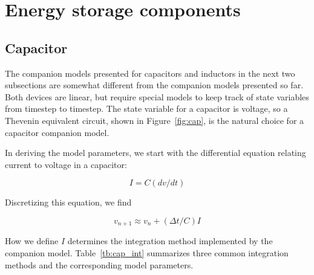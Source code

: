 \documentclass{article}
\begin{document}
\pagebreak

\section{Energy storage components}
\subsection{Capacitor}

The companion models presented for capacitors and inductors in the next two subsections are somewhat different from the companion models presented so far.  Both devices are linear, but require special models to keep track of state variables from timestep to timestep.  The state variable for a capacitor is voltage, so a Thevenin equivalent circuit, shown in Figure~\ref{fig:cap}, is the natural choice for a capacitor companion model.

In deriving the model parameters, we start with the differential equation relating current to voltage in a capacitor:

\begin{equation}
I=C(dv/dt)
\end{equation}

Discretizing this equation, we find

\begin{equation}
v_{n+1} \approx v_n+(\Delta t/C)I
\end{equation}

How we define $I$ determines the integration method implemented by the companion model.  Table~\ref{tb:cap_int} summarizes three common integration methods and the corresponding model parameters.

\begin{table}[h]
\centering
\caption{Capacitor companion model parameters for integration methods \label{tb:cap_int}}
\end{table}
\end{document}
